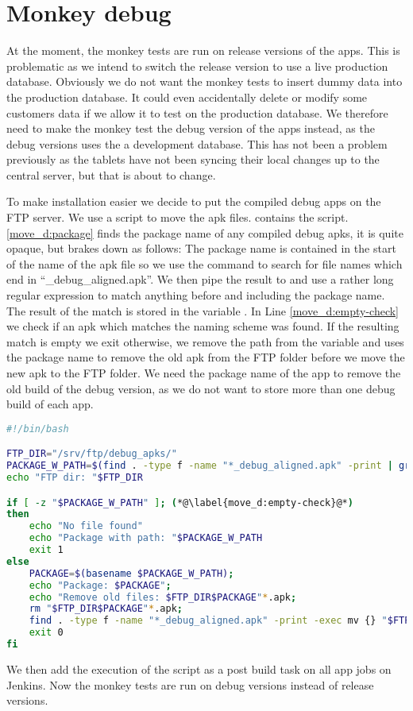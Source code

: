 \chapter{Monkey debug}

At the moment, the monkey tests are run on release versions of the apps. This is problematic as we intend to switch the release version to use a live production database. Obviously we do not want the monkey tests to insert dummy data into the production database. It could even accidentally delete or modify some customers data if we allow it to test on the production database. We therefore need to make the monkey test the debug version of the apps instead, as the debug versions uses the a development database. This has not been a problem previously as the tablets have not been syncing their local changes up to the central server, but that is about to change.

To make installation easier we decide to put the compiled debug apps on the FTP server. We use a  script to move the apk files.  contains the script. \ref{move_d:package} finds the package name of any compiled debug apks, it is quite opaque, but brakes down as follows: The package name is contained in the start of the name of the apk file so we use the  command to search for file names which end in ``\_debug\_aligned.apk''. We then pipe the result to  and use a rather long regular expression to match anything before and including the package name. The result of the match is stored in the variable . In Line \ref{move_d:empty-check} we check if an apk which matches the naming scheme was found. If the resulting match is empty we exit otherwise, we remove the path from the variable  and uses the package name to remove the old apk from the FTP folder before we move the new apk to the FTP folder. We need the package name of the app to remove the old build of the debug version, as we do not want to store more than one debug build of each app.
\begin{lstlisting}[language=bash,showstringspaces=false,caption=Script that moves the debug apk to the ftp server,label=lst:move_debug_apk]
#!/bin/bash

FTP_DIR="/srv/ftp/debug_apks/"
PACKAGE_W_PATH=$(find . -type f -name "*_debug_aligned.apk" -print | grep ".+(?=_v[0-9]+\.[0-9]+b[0-9]+_debug_aligned\.apk)" -Po) (*@\label{move_d:package}@*)
echo "FTP dir: "$FTP_DIR

if [ -z "$PACKAGE_W_PATH" ]; (*@\label{move_d:empty-check}@*)
then
    echo "No file found"
    echo "Package with path: "$PACKAGE_W_PATH
    exit 1
else
    PACKAGE=$(basename $PACKAGE_W_PATH);
    echo "Package: $PACKAGE";
    echo "Remove old files: $FTP_DIR$PACKAGE"*.apk;
    rm "$FTP_DIR$PACKAGE"*.apk;
    find . -type f -name "*_debug_aligned.apk" -print -exec mv {} "$FTP_DIR" \;
    exit 0
fi


\end{lstlisting}
We then add the execution of the script as a post build task on all app jobs on Jenkins. 
Now the monkey tests are run on debug versions instead of release versions.